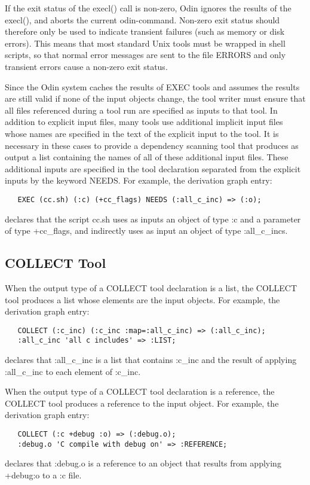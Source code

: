 If the exit status of the {\ex execl()} call is non-zero,
Odin ignores the results of the {\ex execl()},
and aborts the current odin-command.
Non-zero exit status should therefore only be used to indicate
transient failures (such as memory or disk errors).
This means that most standard Unix tools must be wrapped in shell scripts,
so that normal error messages are sent to the file {\ex ERRORS}
and only transient errors cause a non-zero exit status.

Since the Odin system caches the results of {\ex EXEC} tools
and assumes the results are still valid if none of the input objects change,
the tool writer must ensure that all files referenced during a tool run
are specified as inputs to that tool.
In addition to explicit input files,
many tools use additional implicit input files whose names are specified
in the text of the explicit input to the tool.
It is necessary in these cases to provide a dependency scanning tool
that produces as output a list containing the names of all of these
additional input files.
These additional inputs are specified in the tool declaration
separated from the explicit inputs by the keyword {\ex NEEDS}.
For example, the derivation graph entry:
\begin{verbatim}
   EXEC (cc.sh) (:c) (+cc_flags) NEEDS (:all_c_inc) => (:o);
\end{verbatim}
declares that the script {\ex cc.sh} uses as inputs an object of type {\ex :c}
and a parameter of type {\ex +cc\_flags},
and indirectly uses as input an object of type {\ex :all\_c\_incs}.

\subsection{COLLECT Tool}

When the output type of a {\ex COLLECT} tool declaration is a list,
the {\ex COLLECT} tool produces a list whose elements are the input objects.
For example, the derivation graph entry:
\begin{verbatim}
   COLLECT (:c_inc) (:c_inc :map=:all_c_inc) => (:all_c_inc);
   :all_c_inc 'all c includes' => :LIST;
\end{verbatim}
declares that {\ex :all\_c\_inc} is a list that contains {\ex :c\_inc}
and the result of applying {\ex :all\_c\_inc} to each element of {\ex :c\_inc}.

When the output type of a {\ex COLLECT} tool declaration is a reference,
the {\ex COLLECT} tool produces a reference to the input object.
For example, the derivation graph entry:
\begin{verbatim}
   COLLECT (:c +debug :o) => (:debug.o);
   :debug.o 'C compile with debug on' => :REFERENCE;
\end{verbatim}
declares that {\ex :debug.o} is a reference to an object that
results from applying {\ex +debug:o} to a {\ex :c} file.

